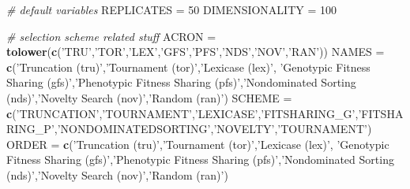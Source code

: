 \documentclass[]{book}
\newenvironment{Shaded}{\begin{snugshade}}{\end{snugshade}}
\newcommand{\CommentTok}[1]{\textcolor[rgb]{0.56,0.35,0.01}{\textit{#1}}}
\newcommand{\DecValTok}[1]{\textcolor[rgb]{0.00,0.00,0.81}{#1}}
\newcommand{\KeywordTok}[1]{\textcolor[rgb]{0.13,0.29,0.53}{\textbf{#1}}}
\newcommand{\NormalTok}[1]{#1}
\newcommand{\StringTok}[1]{\textcolor[rgb]{0.31,0.60,0.02}{#1}}
\begin{document}
\begin{Shaded}
\begin{Highlighting}[]
\CommentTok{# default variables}
\NormalTok{REPLICATES =}\StringTok{ }\DecValTok{50}
\NormalTok{DIMENSIONALITY =}\StringTok{ }\DecValTok{100}

\CommentTok{# selection scheme related stuff}
\NormalTok{ACRON =}\StringTok{ }\KeywordTok{tolower}\NormalTok{(}\KeywordTok{c}\NormalTok{(}\StringTok{'TRU'}\NormalTok{,}\StringTok{'TOR'}\NormalTok{,}\StringTok{'LEX'}\NormalTok{,}\StringTok{'GFS'}\NormalTok{,}\StringTok{'PFS'}\NormalTok{,}\StringTok{'NDS'}\NormalTok{,}\StringTok{'NOV'}\NormalTok{,}\StringTok{'RAN'}\NormalTok{))}
\NormalTok{NAMES =}\StringTok{ }\KeywordTok{c}\NormalTok{(}\StringTok{'Truncation (tru)'}\NormalTok{,}\StringTok{'Tournament (tor)'}\NormalTok{,}\StringTok{'Lexicase (lex)'}\NormalTok{, }\StringTok{'Genotypic Fitness Sharing (gfs)'}\NormalTok{,}\StringTok{'Phenotypic Fitness Sharing (pfs)'}\NormalTok{,}\StringTok{'Nondominated Sorting (nds)'}\NormalTok{,}\StringTok{'Novelty Search (nov)'}\NormalTok{,}\StringTok{'Random (ran)'}\NormalTok{)}
\NormalTok{SCHEME =}\StringTok{ }\KeywordTok{c}\NormalTok{(}\StringTok{'TRUNCATION'}\NormalTok{,}\StringTok{'TOURNAMENT'}\NormalTok{,}\StringTok{'LEXICASE'}\NormalTok{,}\StringTok{'FITSHARING_G'}\NormalTok{,}\StringTok{'FITSHARING_P'}\NormalTok{,}\StringTok{'NONDOMINATEDSORTING'}\NormalTok{,}\StringTok{'NOVELTY'}\NormalTok{,}\StringTok{'TOURNAMENT'}\NormalTok{)}
\NormalTok{ORDER =}\StringTok{ }\KeywordTok{c}\NormalTok{(}\StringTok{'Truncation (tru)'}\NormalTok{,}\StringTok{'Tournament (tor)'}\NormalTok{,}\StringTok{'Lexicase (lex)'}\NormalTok{, }\StringTok{'Genotypic Fitness Sharing (gfs)'}\NormalTok{,}\StringTok{'Phenotypic Fitness Sharing (pfs)'}\NormalTok{,}\StringTok{'Nondominated Sorting (nds)'}\NormalTok{,}\StringTok{'Novelty Search (nov)'}\NormalTok{,}\StringTok{'Random (ran)'}\NormalTok{)}


\end{Highlighting}
\end{Shaded}
\end{document}
